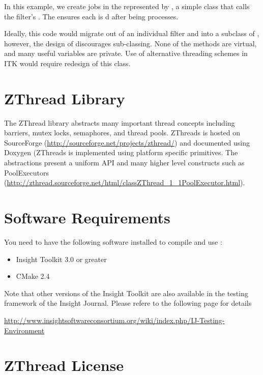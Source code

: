 \documentclass{InsightArticle}
\begin{document}
In this example, we create  jobs in the  represented by , a simple class that calls the filter's .  The  ensures each  is d after being processes.

Ideally, this code would migrate out of an individual filter and into a subclass of , however, the design of  discourages sub-classing.  None of the methods are virtual, and many useful variables are private.  Use of alternative threading schemes in ITK would require redesign of this class.

\section{ZThread Library}
The ZThread library abstracts many important thread concepts including barriers, mutex locks, semaphores, and thread pools.  ZThreads is hosted on SourceForge (\url{http://sourceforge.net/projects/zthread/}) and documented using Doxygen (ZThreads is implemented using platform specific primitives.  The abstractions present a uniform API and many higher level constructs such as PoolExecutors (\url{http://zthread.sourceforge.net/html/classZThread_1_1PoolExecutor.html}).

\section{Software Requirements}

You need to have the following software installed to compile and use :

\begin{itemize}
  \item  Insight Toolkit 3.0 or greater
  \item  CMake 2.4
\end{itemize}

Note that other versions of the Insight Toolkit are also available in the
testing framework of the Insight Journal. Please refere to the following page
for details

\url{http://www.insightsoftwareconsortium.org/wiki/index.php/IJ-Testing-Environment}

\section{ZThread License}
\end{document}
